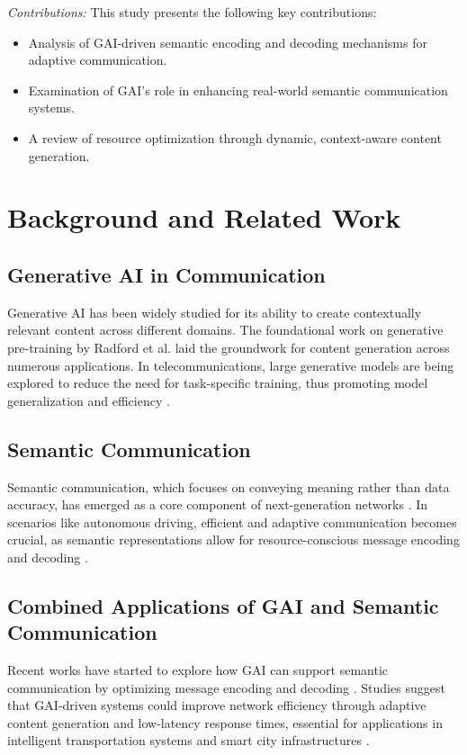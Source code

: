 \documentclass[journal]{IEEEtran}
\begin{document}
\textit{Contributions:} This study presents the following key contributions:
\begin{itemize}
    \item Analysis of GAI-driven semantic encoding and decoding mechanisms for adaptive communication.
    \item Examination of GAI’s role in enhancing real-world semantic communication systems.
    \item A review of resource optimization through dynamic, context-aware content generation.
\end{itemize}




\section{Background and Related Work}

\subsection{Generative AI in Communication}
Generative AI has been widely studied for its ability to create contextually relevant content across different domains. The foundational work on generative pre-training by Radford et al. \cite{Radford2018ImprovingLU} laid the groundwork for content generation across numerous applications. In telecommunications, large generative models are being explored to reduce the need for task-specific training, thus promoting model generalization and efficiency \cite{bariah2023largegenerativeaimodels,10614204}.

\subsection{Semantic Communication}
Semantic communication, which focuses on conveying meaning rather than data accuracy, has emerged as a core component of next-generation networks \cite{9955312}. In scenarios like autonomous driving, efficient and adaptive communication becomes crucial, as semantic representations allow for resource-conscious message encoding and decoding \cite{10319661,raha2023generativeaidrivensemanticcommunication}.

\subsection{Combined Applications of GAI and Semantic Communication}
Recent works have started to explore how GAI can support semantic communication by optimizing message encoding and decoding \cite{10447237}. Studies suggest that GAI-driven systems could improve network efficiency through adaptive content generation and low-latency response times, essential for applications in intelligent transportation systems and smart city infrastructures \cite{jiang2024largeaimodelbasedsemantic}.
\end{document}

